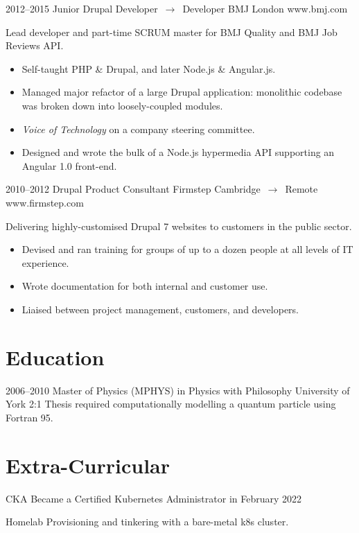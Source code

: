 \documentclass[11pt, a4paper, sans]{moderncv}
\begin{document}
\vspace*{3mm}

\cventry
  {2012--2015}
  {Junior Drupal Developer $\,\to\,$ Developer}
  {BMJ}
  {London}
  {www.bmj.com}
  {
    Lead developer and part-time SCRUM master for BMJ Quality and BMJ Job Reviews API.
    \begin{itemize}
      \item Self-taught PHP \& Drupal, and later Node.js \& Angular.js.
      \item Managed major refactor of a large Drupal application: monolithic codebase was broken down into loosely-coupled modules.
      \item \emph{Voice of Technology} on a company steering committee.
      \item Designed and wrote the bulk of a Node.js hypermedia API supporting an Angular 1.0 front-end.
    \end{itemize}
  }

\vspace*{3mm}

\cventry
  {2010--2012}
  {Drupal Product Consultant}
  {Firmstep}
  {Cambridge $\,\to\,$ Remote}
  {www.firmstep.com}
  {
    Delivering highly-customised Drupal 7 websites to customers in the public sector.
    \begin{itemize}
      \item Devised and ran training for groups of up to a dozen people at all levels of IT experience.
      \item Wrote documentation for both internal and customer use.
      \item Liaised between project management, customers, and developers.
    \end{itemize}
  }

\section{Education}

\cventry
  {2006--2010}
  {Master of Physics (\small{MPHYS}) in Physics with Philosophy}
  {University of York}
  {}
  {2:1}
  {
    Thesis required computationally modelling a quantum particle using Fortran 95.
  }

\section{Extra-Curricular}

\cvitem
  {CKA}
  {
		Became a Certified Kubernetes Administrator in February 2022
  }

\vspace*{3mm}

\cvitem
	{Homelab}
  {
		Provisioning and tinkering with a bare-metal k8s cluster.
  }
\end{document}

